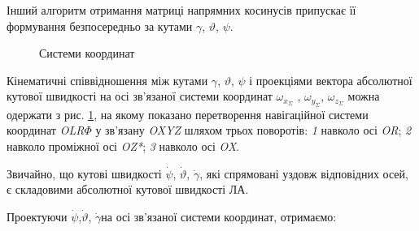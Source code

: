 Інший алгоритм отримання матриці напрямних косинусів припускає її  формування безпосередньо 
за кутами  $\gamma$, $\vartheta$, $\psi$. 
\begin{figure}[here]
\centering
\caption{Системи координат}
\label{fig:kinemat}
\end{figure} 
Кінематичні співвідношення між кутами $\gamma$, $\vartheta$, $\psi$ і проекціями вектора абсолютної кутової 
швидкості на осі зв'язаної системи координат $\omega_{x_{\Sigma }}$ , $\omega_{y_{\Sigma }}$, 
$\omega_{z_{\Sigma}} $ можна одержати з рис. \ref{fig:kinemat}, 
на якому показано перетворення навігаційної системи координат \textit{OLR$\Phi $ }у 
зв'язану \textit{OXYZ} шляхом трьох поворотів: \textit{1}   навколо осі \textit{OR}; \textit{2}  
навколо проміжної осі \textit{OZ*}; \textit{3}  навколо осі \textit{OX}.

 Звичайно, що кутові швидкості $\dot{\psi }$, $\dot{\vartheta }$, $\dot{\gamma }$, 
які спрямовані уздовж відповідних осей, є складовими абсолютної кутової швидкості 
ЛА.

 Проектуючи $\dot{\psi }$,$\dot{\vartheta }$, $\dot{\gamma }$на осі зв'язаної системи 
координат, отримаємо:

